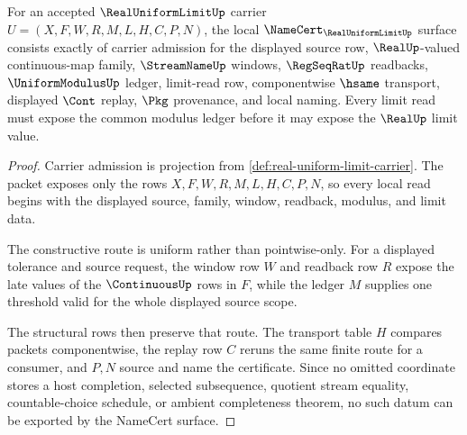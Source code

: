 \begin{theorem}
\label{thm:real-uniform-limit-namecert-obligations}
For an accepted $\RealUniformLimitUp$ carrier $U=(X,F,W,R,M,L,H,C,P,N)$, the local $\NameCert_{\RealUniformLimitUp}$ surface consists exactly of carrier admission for the displayed source row, $\RealUp$-valued continuous-map family, $\StreamNameUp$ windows, $\RegSeqRatUp$ readbacks, $\UniformModulusUp$ ledger, limit-read row, componentwise $\hsame$ transport, displayed $\Cont$ replay, $\Pkg$ provenance, and local naming. Every limit read must expose the common modulus ledger before it may expose the $\RealUp$ limit value.
\end{theorem}
\begin{proof}
Carrier admission is projection from \autoref{def:real-uniform-limit-carrier}. The packet exposes only the rows $X,F,W,R,M,L,H,C,P,N$, so every local read begins with the displayed source, family, window, readback, modulus, and limit data.

The constructive route is uniform rather than pointwise-only. For a displayed tolerance and source request, the window row $W$ and readback row $R$ expose the late values of the $\ContinuousUp$ rows in $F$, while the ledger $M$ supplies one threshold valid for the whole displayed source scope.

The structural rows then preserve that route. The transport table $H$ compares packets componentwise, the replay row $C$ reruns the same finite route for a consumer, and $P,N$ source and name the certificate. Since no omitted coordinate stores a host completion, selected subsequence, quotient stream equality, countable-choice schedule, or ambient completeness theorem, no such datum can be exported by the NameCert surface.
\end{proof}

